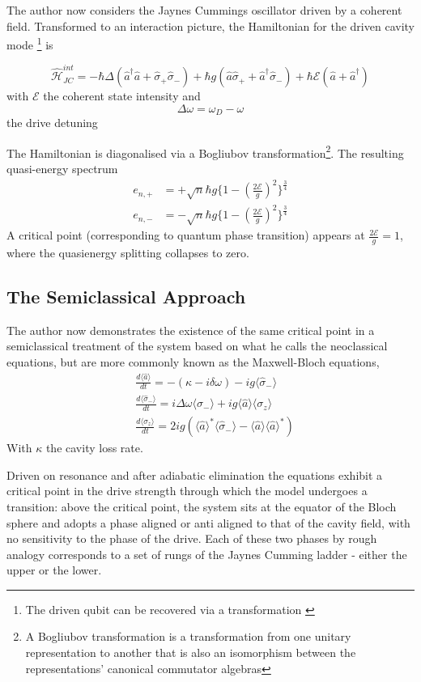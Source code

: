 \documentclass[reqno]{amsart}
\newcommand{\ham}{\hat{\mathscr{H}}}
\newcommand{\cre}{\hat{a}^\dagger}
\newcommand{\ann}{\hat{a}}
\newcommand{\atann}{\hat{\sigma}_-}
\newcommand{\atcre}{\hat{\sigma}_+}
\newcommand{\qexp}[1]{\langle #1 \rangle}
\newcommand{\Epsilon}{\mathcal{E}}
\begin{document}
The author now considers the Jaynes Cummings oscillator driven by a coherent field. Transformed to an interaction picture, the Hamiltonian for the driven cavity mode \footnote{The driven qubit can be recovered via a transformation \autocite{Alsing1999}} is 

\begin{equation}
	\ham_{JC}^{int} = -\hbar \Delta (\cre \ann + \atcre \atann) + \hbar g(\ann \atcre + \cre \atann) + \hbar \Epsilon(\ann + \cre)
\end{equation}
with $\Epsilon$ the coherent state intensity and
\begin{equation}
	\Delta \omega = \omega_D - \omega
\end{equation}
the drive detuning

The Hamiltonian is diagonalised via a Bogliubov transformation\footnote{A Bogliubov transformation is a transformation from one unitary representation to another that is also an isomorphism between the representations' canonical commutator algebras}. The resulting quasi-energy spectrum
\begin{align}
	e_{n, +} &= + \sqrt{n} \hbar g \{1 - ({\frac{2\Epsilon}{g}})^2\}^{\frac{3}{4}} \\
	e_{n, -} &= - \sqrt{n} \hbar g \{1 - ({\frac{2\Epsilon}{g}})^2\}^{\frac{3}{4}}
\end{align}
A critical point (corresponding to quantum phase transition) appears at $\frac{2\Epsilon}{g} = 1$, where the quasienergy splitting collapses to zero.

\subsection{The Semiclassical Approach}
The author now demonstrates the existence of the same critical point in a semiclassical treatment of the system based on what he calls the neoclassical equations, but are more commonly known as the Maxwell-Bloch equations, 
\begin{align}
	&\frac{d \qexp{\ann}}{dt} = -(\kappa -i \delta \omega)-ig \qexp{\atann} \\
	&\frac{d \qexp{\atann}}{dt} = i \Delta \omega \qexp{\atann} +ig \qexp{\ann} \qexp{\sigma_z} \\	
	&\frac{d \qexp{\sigma_z}}{dt} = 2 i g(\qexp{\ann}^* \qexp{\atann} -\qexp{\ann} \qexp{\ann}^*)
\end{align}
With $\kappa$ the cavity loss rate.

Driven on resonance and after adiabatic elimination the equations exhibit a critical point in the drive strength through which the model undergoes a transition: above the critical point, the system sits at the equator of the Bloch sphere and adopts a phase aligned or anti aligned to that of the cavity field, with no sensitivity to the phase of the drive. Each of these two phases by rough analogy corresponds to a set of rungs of the Jaynes Cumming ladder - either the upper or the lower. 
\end{document}
